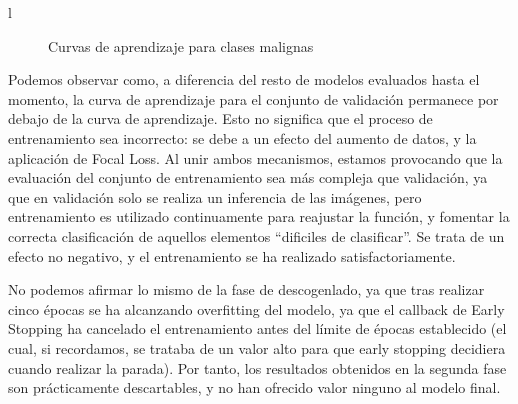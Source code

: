 l\begin{figure}[H]
	\centering
	\caption{Curvas de aprendizaje para clases malignas}
	\label{fig:curvasmalign}
\end{figure}

Podemos observar como, a diferencia del resto de modelos evaluados hasta el momento, la curva de aprendizaje para el conjunto de validación permanece por debajo de la curva de aprendizaje. Esto no significa que el proceso de entrenamiento sea incorrecto: se debe a un efecto del aumento de datos, y la aplicación de Focal Loss. Al unir ambos mecanismos, estamos provocando que la evaluación del conjunto de entrenamiento sea más compleja que validación, ya que en validación solo se realiza un inferencia de las imágenes, pero entrenamiento es utilizado continuamente para reajustar la función, y fomentar la correcta clasificación de aquellos elementos ``dificiles de clasificar''. Se trata de un efecto no negativo, y el entrenamiento se ha realizado satisfactoriamente.

No podemos afirmar lo mismo de la fase de descogenlado, ya que tras realizar cinco épocas se ha alcanzando overfitting del modelo, ya que el callback de Early Stopping ha cancelado el entrenamiento antes del límite de épocas establecido (el cual, si recordamos, se trataba de un valor alto para que early stopping decidiera cuando realizar la parada). Por tanto, los resultados obtenidos en la segunda fase son prácticamente descartables, y no han ofrecido valor ninguno al modelo final.

